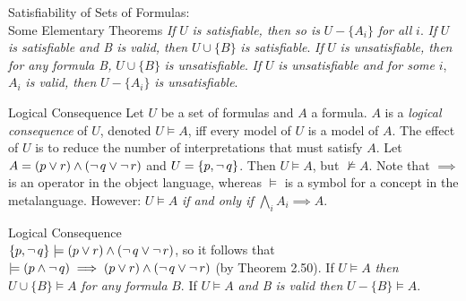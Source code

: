 \documentclass[style=sailor,size=12pt]{powerdot}
\theoremstyle{definition}
\newenvironment{defn}[1]
  {\renewcommand\theinnerdefn{#1}\innerdefn}
  {\endinnerdefn}
\newenvironment{ex}[1]
  {\renewcommand\theinnerexample{#1}\innerexample}
  {\endinnerexample}
\newenvironment{thm}[1]
  {\renewcommand\theinnerthm{#1}\innerthm}
  {\endinnerthm}
\begin{document}
\begin{wideslide}[bm=,toc=]{Satisfiability of Sets of Formulas:\\ Some Elementary
Theorems}
\begin{thm}{2.44}
{ \em If} $U$ {\em is satisfiable, then so is} $U - \{A_i\}$ {\em for all} $i$. 
\end{thm}
\begin{thm}{2.45}
{ \em If} $U$ {\em is satisfiable and B is valid, then} $U \cup \{B\}$ {\em is
  satisfiable}. 
\end{thm}
\begin{thm}{2.46}
{ \em If} $U$ {\em is unsatisfiable, then for any formula B,} $U \cup \{B\}$ {\em is
  unsatisfiable}. 
\end{thm}
\begin{thm}{2.47}
{ \em If} $U$ {\em is unsatisfiable and for some } $i$, $A_i$ { \em is valid,
  then} $U - \{A_i\}$ {\em is unsatisfiable}. 
\end{thm}
\end{wideslide}

\begin{wideslide}[bm=,toc=]{Logical Consequence}
\begin{defn}{2.48}[Ben Ari]
Let $U$ be a set of formulas and $A$ a formula. $A$ is a \emph{logical
  consequence} of $U$, denoted $U \models A$, iff every model of $U$ is a
  model of $A$.
\end{defn}
The effect of $U$ is to reduce the number of interpretations that must satisfy
$A$.
\begin{ex}{2.49}[Ben Ari]
Let $A = (p \lor r) \land (\mathop{\neg} q \lor \mathop{\neg} r)$ and $U = \{p,\mathop{\neg} q\}$.
Then $U \models A$, but $\not\models A$.
\end{ex}
Note that $\implies$ is an operator in the object language, whereas $\models$
is a symbol for a concept in the metalanguage. However:
\begin{thm}{2.50}
$U \models A$ \emph{if and only if } $\bigwedge\limits_{i} A_i \implies A$. 
\end{thm}
\end{wideslide}

\begin{wideslide}[bm=,toc=]{Logical Consequence}
\begin{ex}{2.52}[Ben Ari]
~\\
$\{p,\mathop{\neg} q\} \models (p \lor r) \land (\mathop{\neg} q \lor \mathop{\neg} r)$, so it follows that\\
$\models (p \land \mathop{\neg} q) \implies (p \lor r) \land (\mathop{\neg} q \lor \mathop{\neg} r)$
(by Theorem 2.50).
\end{ex}
\begin{thm}{2.53}
If $U \models A$ \emph{then} $U \cup \{B\} \models A$ \emph{for any formula} $B$. 
\end{thm}
\begin{thm}{2.54}
If $U \models A$ \emph{ and B is valid then} $U - \{B\} \models A$. 
\end{thm}

\end{wideslide}
\end{document}
